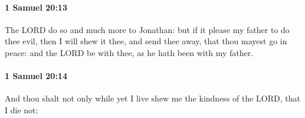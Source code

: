 		\paragraph{1 Samuel 20:13} %
			\label{1SAMUEL-20-13}

			The LORD do so and much more to Jonathan: but if it please my father to do thee evil, then I will shew it thee, and send thee away, that thou mayest go in peace: and the LORD be with thee, as he hath been with my father.


		\paragraph{1 Samuel 20:14} %
			\label{1SAMUEL-20-14}

			And thou shalt not only while yet I live shew me the kindness of the LORD, that I die not:


